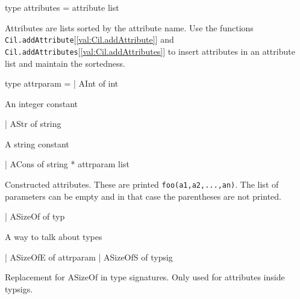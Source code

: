 \documentclass[11pt]{article}
\begin{document}
\label{type:Cil.attributes}\begin{ocamldoccode}
type attributes = attribute list 
\end{ocamldoccode}
\begin{ocamldocdescription}
Attributes are lists sorted by the attribute name. Use the functions 
 {\tt{Cil.addAttribute}}[\ref{val:Cil.addAttribute}] and {\tt{Cil.addAttributes}}[\ref{val:Cil.addAttributes}] to insert attributes in an 
 attribute list and maintain the sortedness.


\end{ocamldocdescription}




\label{type:Cil.attrparam}\begin{ocamldoccode}
type attrparam =
  | AInt of int
\end{ocamldoccode}
\begin{ocamldoccomment}
An integer constant
\end{ocamldoccomment}
\begin{ocamldoccode}
  | AStr of string
\end{ocamldoccode}
\begin{ocamldoccomment}
A string constant
\end{ocamldoccomment}
\begin{ocamldoccode}
  | ACons of string * attrparam list
\end{ocamldoccode}
\begin{ocamldoccomment}
Constructed attributes. These 
                                             are printed {\tt{foo(a1,a2,...,an)}}. 
                                             The list of parameters can be 
                                             empty and in that case the 
                                             parentheses are not printed.
\end{ocamldoccomment}
\begin{ocamldoccode}
  | ASizeOf of typ
\end{ocamldoccode}
\begin{ocamldoccomment}
A way to talk about types
\end{ocamldoccomment}
\begin{ocamldoccode}
  | ASizeOfE of attrparam
  | ASizeOfS of typsig
\end{ocamldoccode}
\begin{ocamldoccomment}
Replacement for ASizeOf in type
                                             signatures.  Only used for
                                             attributes inside typsigs.
\end{ocamldoccomment}
\end{document}
